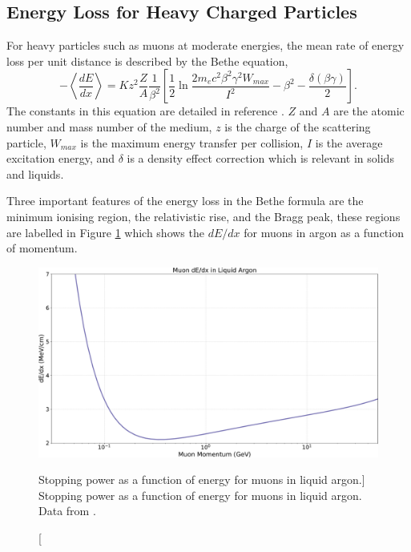 \subsection{Energy Loss for Heavy Charged Particles}
For heavy particles such as muons at moderate energies, the mean rate of 
energy loss per unit distance is described by the Bethe equation,
\begin{equation}
	- \left< \frac{dE}{dx}\right> = K z^2 \frac{Z}{A} \frac{1}{\beta^2} 
	\left[ \frac{1}{2} \ln \frac{2 m_e c^2 \beta^2 \gamma^2 W_{max}}{I^2} -
	\beta^2 - \frac{\delta(\beta \gamma)}{2}\right].
	\label{eq:mu_stop}
\end{equation}
The constants in this equation are detailed in reference
\cite{PhysRevD.98.030001}. $Z$ and $A$ are the atomic number and mass number of
the medium, $z$ is the charge of the scattering particle, $W_{max}$ is the 
maximum energy transfer per collision, $I$ is the average excitation energy, 
and $\delta$ is a density effect correction which is relevant in solids and 
liquids. 

Three important features of the energy loss in the Bethe formula are the minimum
ionising region, the relativistic rise, and the Bragg peak, these regions are
labelled in Figure \ref{fig:muon_dedx} which shows the $dE/dx$ for muons in 
argon as a function of momentum.
\begin{figure}

	\centering

	\includegraphics[width=\textwidth]{figures/muon_dedx_argon.pdf}

	\caption
	[Stopping power as a function of energy for muons in liquid argon.]
	{ Stopping power as a function of energy for muons in liquid argon. Data from
	\cite{pdg_atomictables}.}

	\label{fig:muon_dedx}

\end{figure}

